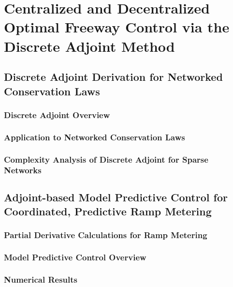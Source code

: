 \chapter{Centralized and Decentralized Optimal Freeway Control via the Discrete Adjoint Method}
\label{chapter:adjoint}

\section{Discrete Adjoint Derivation for Networked Conservation Laws}

\subsection{Discrete Adjoint Overview}

\subsection{Application to Networked Conservation Laws}

\subsection{Complexity Analysis of Discrete Adjoint for Sparse Networks}

\section{Adjoint-based Model Predictive Control for Coordinated, Predictive Ramp Metering}

\subsection{Partial Derivative Calculations for Ramp Metering}

\subsection{Model Predictive Control Overview}
\label{sec:model-predictive-control-overview-adjoint-section}



\subsection{Numerical Results}
\label{sec:numerical-results-adjoint}